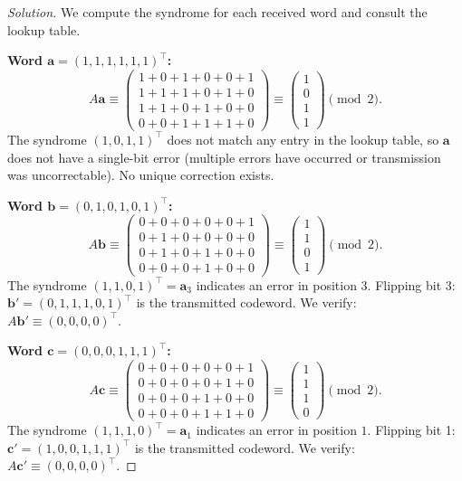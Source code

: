 \begin{proof}[Solution]
We compute the syndrome for each received word and consult the lookup table.

\textbf{Word $\mathbf{a} = (1,1,1,1,1,1)^{\top}$:}
\[
    A\mathbf{a} \equiv
    \begin{pmatrix}
        1{+}0{+}1{+}0{+}0{+}1\\
        1{+}1{+}1{+}0{+}1{+}0\\
        1{+}1{+}0{+}1{+}0{+}0\\
        0{+}0{+}1{+}1{+}1{+}0
    \end{pmatrix}
    \equiv
    \begin{pmatrix}1\\0\\1\\1\end{pmatrix} \pmod{2}.
\]
The syndrome $(1,0,1,1)^{\top}$ does not match any entry in the lookup table,
so $\mathbf{a}$ does not have a single-bit error (multiple errors have occurred
or transmission was uncorrectable). No unique correction exists.

\medskip
\textbf{Word $\mathbf{b} = (0,1,0,1,0,1)^{\top}$:}
\[
    A\mathbf{b} \equiv
    \begin{pmatrix}
        0{+}0{+}0{+}0{+}0{+}1\\
        0{+}1{+}0{+}0{+}0{+}0\\
        0{+}1{+}0{+}1{+}0{+}0\\
        0{+}0{+}0{+}1{+}0{+}0
    \end{pmatrix}
    \equiv
    \begin{pmatrix}1\\1\\0\\1\end{pmatrix} \pmod{2}.
\]
The syndrome $(1,1,0,1)^{\top} = \mathbf{a}_3$ indicates an error in position $3$.
Flipping bit 3: $\mathbf{b}' = (0,1,1,1,0,1)^{\top}$ is the transmitted codeword.
We verify: $A\mathbf{b}' \equiv (0,0,0,0)^{\top}$.

\medskip
\textbf{Word $\mathbf{c} = (0,0,0,1,1,1)^{\top}$:}
\[
    A\mathbf{c} \equiv
    \begin{pmatrix}
        0{+}0{+}0{+}0{+}0{+}1\\
        0{+}0{+}0{+}0{+}1{+}0\\
        0{+}0{+}0{+}1{+}0{+}0\\
        0{+}0{+}0{+}1{+}1{+}0
    \end{pmatrix}
    \equiv
    \begin{pmatrix}1\\1\\1\\0\end{pmatrix} \pmod{2}.
\]
The syndrome $(1,1,1,0)^{\top} = \mathbf{a}_1$ indicates an error in position $1$.
Flipping bit 1: $\mathbf{c}' = (1,0,0,1,1,1)^{\top}$ is the transmitted codeword.
We verify: $A\mathbf{c}' \equiv (0,0,0,0)^{\top}$.
\end{proof}
